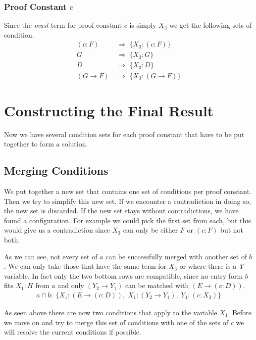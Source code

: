 \subsubsection[look up proof constant c]{Proof Constant $c$}
Since the \emph{must} term for proof constant $c$ is simply $X_3$ we get the following sets of condition.
\begin{align}
	(c:F) & \; \Rightarrow \; \{X_3: (c:F)\} \nonumber\\ 
	G & \; \Rightarrow \; \{X_3: G\} \nonumber\\ 
	D & \; \Rightarrow \; \{X_3: D\}\label{condition:c} \nonumber\\ 
	(G \rightarrow F) & \; \Rightarrow \; \{X_3: (G \rightarrow F)\} 
\end{align}

\section{Constructing the Final Result}
Now we have several condition sets for each proof constant that have to be put together to form a solution.
\subsection{Merging Conditions}
We put together a new set that contains one set of conditions per proof constant. Then we try to simplify this new set. If we encounter a contradiction in doing so, the new set is discarded. If the new set stays without contradictions, we have found a configuration.
For example we could pick the first set from each, but this would give us a contradiction since $X_3$ can only be either $F$ or $(c:F)$ but not both.

As we can see, not every set of $a$ can be successfully merged with another set of $b$. We can only take those that have the same term for $X_3$ or where there is a \emph{Y} variable. In fact only the two bottom rows are compatible, since no entry form $b$ fits $X_1: H$ from $a$ and only $(Y_2 \rightarrow Y_1)$ can be matched with $(E \rightarrow (c:D))$.
\begin{align}
	a \cap b: \; \{X_1: (E \rightarrow (c:D)), \; X_1: (Y_2 \rightarrow Y_1), \; Y_1: (c:X_3)\}
\end{align}

As seen above there are now two conditions that apply to the variable $X_1$. Before we move on and try to merge this set of conditions with one of the sets of $c$ we will resolve the current conditions if possible.

